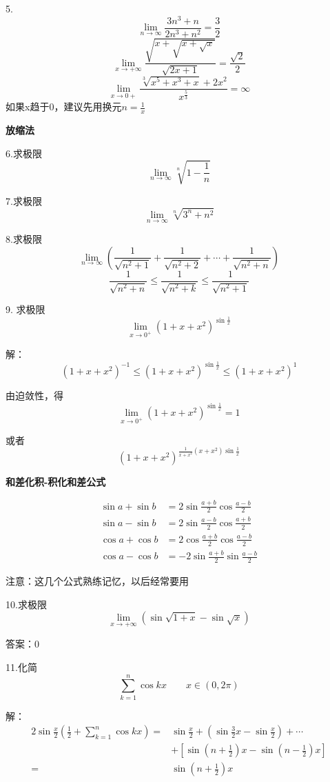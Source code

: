 \documentclass[12pt, a4paper]{ctexart}
\begin{document}
\begin{flushleft}
    5.
    \[\lim \limits _{n \rightarrow \infty} \frac{3n^3+n}{2n^3+n^2}=\frac{3}{2}\]
    \[\lim \limits _{x \rightarrow +\infty} \frac{\sqrt{x+\sqrt{x+\sqrt{x}}}}{\sqrt{2x+1}}=\frac{\sqrt{2}}{2}\]
    \[\lim \limits _{x \rightarrow 0+} \frac{\sqrt[3]{x^5+x^3+x}+2x^2}{x^{\frac{5}{3}}}=\infty\]
    如果x趋于0，建议先用换元$n=\frac{1}{x}$

    {\bfseries 放缩法}

    6.求极限
    \[\lim \limits _{n \rightarrow \infty} \sqrt[n]{1-\frac{1}{n}}\]

    7.求极限\[
    \lim \limits _{n \rightarrow \infty} \sqrt[n]{3^n + n^2}
    \]


    8.求极限\[
    \lim \limits _{n \rightarrow \infty} \left(\frac{1}{\sqrt{n^2+1}} + \frac{1}{\sqrt{n^2+2}} + \cdots + \frac{1}{\sqrt{n^2+n}} \right)
    \]
    \[\frac{1}{\sqrt{n^2+n}} \leq \frac{1}{ \sqrt{n^2+k} } \leq \frac{1}{ \sqrt{n^2+1} }\]

    9. 求极限
    $$
    \lim _{x \rightarrow 0^{+}}\left(1+x+x^{2}\right)^{\sin \frac{1}{x}}
    $$

    解：
    \[
    \left(1+x+x^{2}\right)^{-1} \leqslant\left(1+x+x^{2}\right)^{\sin \frac{1}{x}} \leqslant\left(1+x+x^{2}\right)^{1}
    \]

    由迫敛性，得$$\lim _{x \rightarrow 0^{+}} (1+x+x^2)^{\sin \frac{1}{x}} = 1$$

    或者\[
    (1+x+x^2)^{\frac{1}{x+x^2}(x+x^2)\sin \frac{1}{x}}
    \]

    {\bfseries 和差化积-积化和差公式}

  
    \begin{align}
    \sin a + \sin b &= 2\sin \frac{a +b}{2} \cos \frac{a-b}{2} \\
    \sin a - \sin b &= 2\sin \frac{a - b}{2} \cos \frac{a + b}{2} \\
    \cos a + \cos b &= 2\cos \frac{a + b}{2} \cos \frac{a-b}{2} \\
    \cos a - \cos b &= -2\sin \frac{a+b}{2} \sin \frac{a-b}{2}
    \end{align}

    注意：这几个公式熟练记忆，以后经常要用
    

    

    10.求极限 \[\lim \limits _{x \rightarrow +\infty} (\sin\sqrt{1+x} - \sin \sqrt{x})\] 

    答案：0

    11.化简\[\sum_{k=1}^n \cos {kx} \qquad x \in (0, 2\pi)\] 

    解：
    \[
    \begin{aligned}
    2\sin \frac{x}{2}\left(\frac{1}{2} + \sum_{k=1}^n \cos {kx}   \right) = &\sin \frac{x}{2} + \left(\sin \frac{3}{2}x - \sin \frac{x}{2}\right) + \cdots \\
    & + \left[ \sin(n + \frac{1}{2}) x - \sin(n - \frac{1}{2})x \right] \\
    = &\sin(n +\frac{1}{2})x
    \end{aligned}
    \]




    \end{flushleft}
\end{document}
